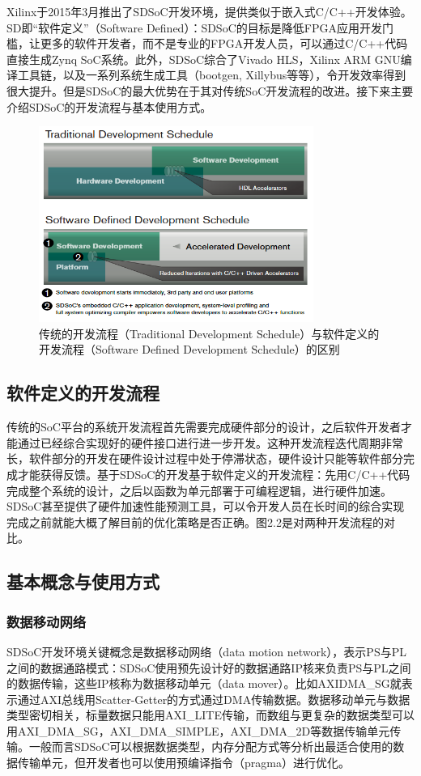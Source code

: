 Xilinx于2015年3月推出了SDSoC开发环境，提供类似于嵌入式C/C++开发体验。SD即“软件定义”（Software Defined）：SDSoC的目标是降低FPGA应用开发门槛，让更多的软件开发者，而不是专业的FPGA开发人员，可以通过C/C++代码直接生成Zynq SoC系统。此外，SDSoC综合了Vivado HLS，Xilinx ARM GNU编译工具链，以及一系列系统生成工具（bootgen, Xillybus等等），令开发效率得到很大提升。但是SDSoC的最大优势在于其对传统SoC开发流程的改进。接下来主要介绍SDSoC的开发流程与基本使用方式。

\begin{figure}[!ht]
\centering
	\includegraphics[width=0.8\textwidth]{assets/imgs/software-defined}
\caption{传统的开发流程（Traditional Development Schedule）与软件定义的开发流程（Software Defined Development Schedule）的区别}
\end{figure}

\subsection{软件定义的开发流程}

传统的SoC平台的系统开发流程首先需要完成硬件部分的设计，之后软件开发者才能通过已经综合实现好的硬件接口进行进一步开发。这种开发流程迭代周期非常长，软件部分的开发在硬件设计过程中处于停滞状态，硬件设计只能等软件部分完成才能获得反馈。基于SDSoC的开发基于软件定义的开发流程：先用C/C++代码完成整个系统的设计，之后以函数为单元部署于可编程逻辑，进行硬件加速。SDSoC甚至提供了硬件加速性能预测工具，可以令开发人员在长时间的综合实现完成之前就能大概了解目前的优化策略是否正确。图2.2是对两种开发流程的对比。

\subsection{基本概念与使用方式}

\subsubsection{数据移动网络}
SDSoC开发环境关键概念是数据移动网络（data motion network），表示PS与PL之间的数据通路模式：SDSoC使用预先设计好的数据通路IP核来负责PS与PL之间的数据传输，这些IP核称为数据移动单元（data mover）。比如AXIDMA\_SG就表示通过AXI总线用Scatter-Getter的方式通过DMA传输数据。数据移动单元与数据类型密切相关，标量数据只能用AXI\_LITE传输，而数组与更复杂的数据类型可以用AXI\_DMA\_SG，AXI\_DMA\_SIMPLE，AXI\_DMA\_2D等数据传输单元传输。一般而言SDSoC可以根据数据类型，内存分配方式等分析出最适合使用的数据传输单元，但开发者也可以使用预编译指令（pragma）进行优化。

